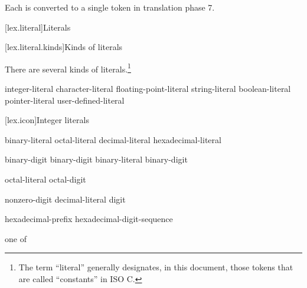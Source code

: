 \documentclass{wg21}
\begin{document}
Each  is converted to a single token
in translation phase 7.%
%

[lex.literal]{Literals}%

[lex.literal.kinds]{Kinds of literals}

\pnum
{}%
%
There are several kinds of literals.\footnote{The term ``literal'' generally designates, in this
    document, those tokens that are called ``constants'' in
    ISO C. }

\begin{bnf}
    \br
    integer-literal\br
    character-literal\br
    floating-point-literal\br
    string-literal\br
    boolean-literal\br
    pointer-literal\br
    user-defined-literal
\end{bnf}

[lex.icon]{Integer literals}

%
\begin{bnf}
    \br
    binary-literal \br
    octal-literal \br
    decimal-literal \br
    hexadecimal-literal 
\end{bnf}

\begin{bnf}
    \br
     binary-digit\br
     binary-digit\br
    binary-literal  binary-digit
\end{bnf}

\begin{bnf}
    \br
    \br
    octal-literal  octal-digit
\end{bnf}

\begin{bnf}
    \br
    nonzero-digit\br
    decimal-literal  digit
\end{bnf}

\begin{bnf}
    \br
    hexadecimal-prefix hexadecimal-digit-sequence
\end{bnf}

\begin{bnf}
     \textnormal{one of}\br
\end{bnf}
\end{document}
